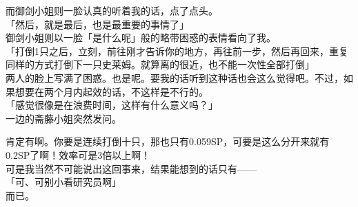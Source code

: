 而御剑小姐则一脸认真的听着我的话，点了点头。\\

「然后，就是最后，也是最重要的事情了」\\

御剑小姐则以一脸「是什么呢」般的略带困惑的表情看向了我。\\

「打倒1只之后，立刻，前往刚才告诉你的地方，再往前一步，然后再回来，重复同样的方式打倒下一只史莱姆。就算离的很近，也不能一次性全部打倒」\\

两人的脸上写满了困惑。也是呢。要我的话听到这种话也会这么觉得吧。不过，如果想要在两个月内起效的话，不这样是不行的。\\

「感觉很像是在浪费时间，这样有什么意义吗？」\\

一边的斋藤小姐突然发问。

肯定有啊。你要是连续打倒十只，那也只有0.059SP，可要是这么分开来就有0.2SP了啊！效率可是3倍以上啊！\\

可是我当然不可能说出这回事来，结果能想到的话只有——\\

「可、可别小看研究员啊」\\

而已。

